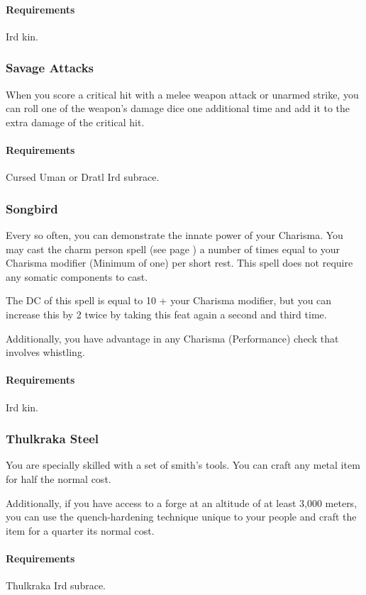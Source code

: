         \paragraph{Requirements} Ird kin.
    \subsubsection{Savage Attacks} \label{feat::savageattacks}
        When you score a critical hit with a melee weapon attack or unarmed strike, you can roll one of the weapon's damage dice one additional time and add it to the extra damage of the critical hit.
        \paragraph{Requirements} Cursed Uman or Dratl Ird subrace.
    \subsubsection{Songbird} \label{feat::songbird}
        Every so often, you can demonstrate the innate power of your Charisma.
        You may cast the charm person spell (see page \pageref{spell::charmperson}) a number of times equal to your Charisma modifier (Minimum of one) per short rest.
        This spell does not require any somatic components to cast.

        The DC of this spell is equal to 10 + your Charisma modifier, but you can increase this by 2 twice by taking this feat again a second and third time.

        Additionally, you have advantage in any Charisma (Performance) check that involves whistling.
        \paragraph{Requirements} Ird kin.
    \subsubsection{Thulkraka Steel} \label{feat::thulkrakasteel}
        You are specially skilled with a set of smith's tools.
        You can craft any metal item for half the normal cost.

        Additionally, if you have access to a forge at an altitude of at least 3,000 meters, you can use the quench-hardening technique unique to your people and craft the item for a quarter its normal cost.
        \paragraph{Requirements} Thulkraka Ird subrace.

